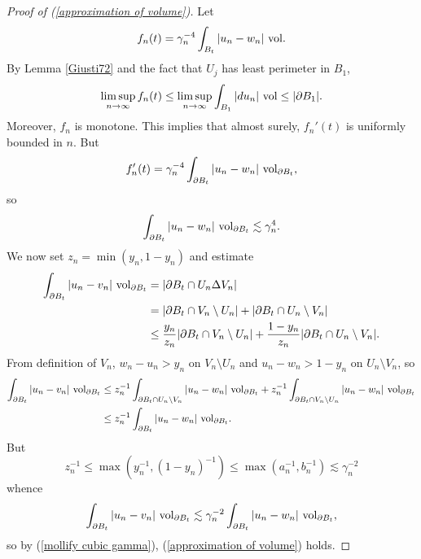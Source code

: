 \begin{proof}[Proof of (\ref{approximation of volume})]
Let
$$f_n(t) = \gamma_n^{-4} \int_{B_t} |u_n - w_n| ~\mathrm{vol}.$$
By Lemma \ref{Giusti72} and the fact that $U_j$ has least perimeter in $B_1$,
$$\limsup_{n \to \infty} f_n(t) \leq \limsup_{n \to \infty} \int_{B_1} |du_n| ~\mathrm{vol} \leq |\partial B_1|.$$
Moreover, $f_n$ is monotone.
This implies that almost surely, $f_n'(t)$ is uniformly bounded in $n$.
But
$$f_n'(t) = \gamma_n^{-4} \int_{\partial B_t} |u_n - w_n| ~\mathrm{vol}_{\partial B_t},$$
so
\begin{equation}\label{mollify cubic gamma}
\int_{\partial B_t} |u_n - w_n| ~\mathrm{vol}_{\partial B_t} \lesssim \gamma_n^4.
\end{equation}
We now set $z_n = \min(y_n, 1 - y_n)$ and estimate
\begin{align*}
\int_{\partial B_t} |u_n - v_n| ~\mathrm{vol}_{\partial B_t} &= |\partial B_t \cap U_n \Delta V_n| \\
&= |\partial B_t \cap V_n \setminus U_n| + |\partial B_t \cap U_n \setminus V_n| \\
&\leq \frac{y_n}{z_n} |\partial B_t \cap V_n \setminus U_n| + \frac{1 - y_n}{z_n} |\partial B_t \cap U_n \setminus V_n|.
\end{align*}
From definition of $V_n$, $w_n - u_n > y_n$ on $V_n \setminus U_n$ and $u_n - w_n > 1 - y_n$ on $U_n \setminus V_n$, so
\begin{align*}
\int_{\partial B_t} |u_n - v_n| ~\mathrm{vol}_{\partial B_t} &\leq z_n^{-1} \int_{\partial B_t \cap U_n \setminus V_n} |u_n - w_n| ~\mathrm{vol}_{\partial B_t} + z_n^{-1}\int_{\partial B_t \cap V_n \setminus U_n} |u_n - w_n| ~\mathrm{vol}_{\partial B_t} \\
&\leq z_n^{-1} \int_{\partial B_t} |u_n - w_n| ~\mathrm{vol}_{\partial B_t}.
\end{align*}
But
$$z_n^{-1} \leq \max(y_n^{-1}, (1 - y_n)^{-1}) \leq \max(a_n^{-1}, b_n^{-1}) \lesssim \gamma_n^{-2}$$
whence
$$\int_{\partial B_t} |u_n - v_n| ~\mathrm{vol}_{\partial B_t} \lesssim \gamma_n^{-2} \int_{\partial B_t} |u_n - w_n| ~\mathrm{vol}_{\partial B_t},$$
so by (\ref{mollify cubic gamma}), (\ref{approximation of volume}) holds.
\end{proof}

